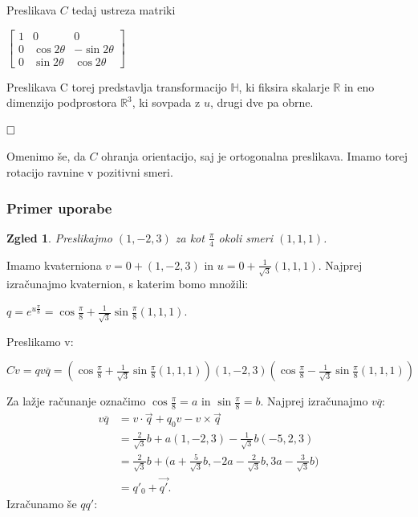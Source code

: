 \documentclass[a4paper,12pt]{article}
\def\R{\mathbb{R}} %
\def\H{\mathbb{H}} %
\newcommand{\conj}[1]{\overline{#1}}
\def\qed{$\hfill\Box$}   %
\newtheorem{zgled}{Zgled}
\begin{document}
\noindent Preslikava $C$ tedaj ustreza matriki
\begin{center}
   $
   \begin{bmatrix}
      1 & 0 & 0 \\
      0 & \cos2\theta & -\sin2\theta \\
      0 & \sin2\theta & \cos2\theta
   \end{bmatrix}
   $
\end{center}
Preslikava C torej predstavlja transformacijo $\H$, ki fiksira skalarje $\R$ in eno dimenzijo podprostora $\R^3$, ki sovpada z $u$, drugi dve pa obrne.

\qed

Omenimo še, da $C$ ohranja orientacijo, saj je ortogonalna preslikava. Imamo torej rotacijo ravnine v pozitivni smeri.
\subsubsection{Primer uporabe}
\begin{zgled}
   Preslikajmo $(1, -2, 3)$ za kot $\frac{\pi}{4}$ okoli smeri $(1,1,1)$.
\end{zgled}
Imamo kvaterniona $v = 0 + (1,-2,3)$ in $u = 0 + \frac{1}{\sqrt{3}}(1,1,1)$.
Najprej izračunajmo kvaternion, s katerim bomo množili:
\begin{center}
   $q = e^{u\frac{\pi}{8}} = \cos\frac{\pi}{8} + \frac{1}{\sqrt{3}}\sin\frac{\pi}{8}(1,1,1)$.
\end{center}
Preslikamo v:
\begin{center}
   $Cv = qv\conj{q} = (\cos\frac{\pi}{8} + \frac{1}{\sqrt{3}}\sin\frac{\pi}{8}(1,1,1))(1,-2,3)(\cos\frac{\pi}{8} - \frac{1}{\sqrt{3}}\sin\frac{\pi}{8}(1,1,1))$
\end{center}
Za lažje računanje označimo $\cos\frac{\pi}{8} = a$ in $\sin\frac{\pi}{8} = b$. 
Najprej izračunajmo $v\conj{q}$:
\begin{align*}
   v\conj{q} &= v\cdot\vec{q} + q_{0}v - v \times \vec{q}\\
             &= \frac{2}{\sqrt{3}} b + a (1,-2,3) - \frac{1}{\sqrt{3}}b(-5,2,3)\\
             &= \frac{2}{\sqrt{3}}b + \bigl( a + \frac{5}{\sqrt{3}}b, -2 a - \frac{2}{\sqrt{3}}b, 3a - \frac{3}{\sqrt{3}}b \bigr)\\
             &= q'_{0} + \vec{q'}.
\end{align*}
Izračunamo še $qq'$:
\end{document}

